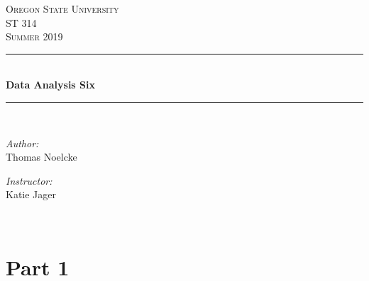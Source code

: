 \documentclass[letterpaper, onecolumn,10pt]{IEEEtran}
\begin{document}
    \begin{titlepage}
    \newcommand{\HRule}{\rule{\linewidth}{0.5mm}}
    \center
    \textsc{\Large Oregon State University}\\[1.5cm]
    \textsc{\Large ST 314}\\[0.5cm]
    \textsc{\Large Summer 2019}\\[0.5cm]
    \HRule \\[0.4cm]
    { \huge \bfseries Data Analysis Six}\\[0.4cm] %
    \HRule \\[1.5cm]
    \begin{minipage}{0.4\textwidth}
        \begin{flushleft} \large
        \emph{Author:}\\
        Thomas Noelcke
        \end{flushleft}
    \end{minipage}
    \begin{minipage}{0.4\textwidth}
        \begin{flushright} \large
        \emph{Instructor:} \\
        Katie Jager\\
        \end{flushright}
    \end{minipage}\\[2cm]
		\end{titlepage}
        
        \section{Part 1}
\end{document}
